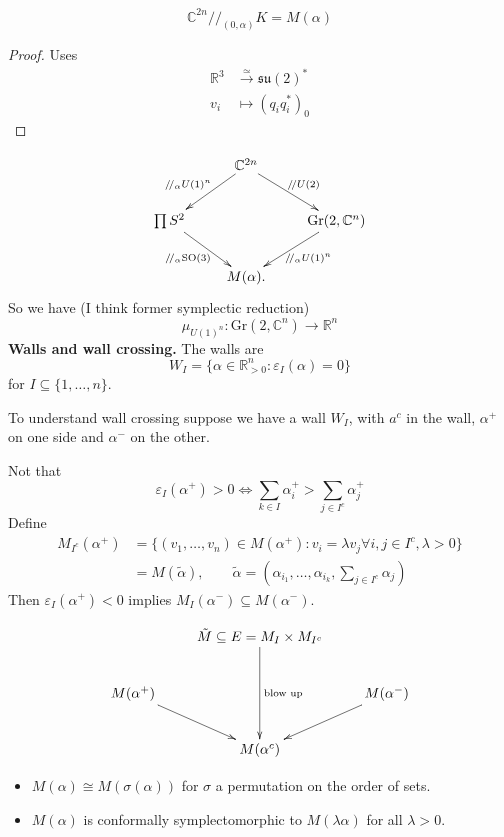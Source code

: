 {\begin{remark}
\begin{theorem}
\label{theorem-Hausmann-Knutson}
$$
\mathbb{C}^{2n}/\!/_{(0,\alpha)}K=M(\alpha)
$$
\end{theorem}

\begin{proof}
Uses 
\begin{align*}
\mathbb{R}^3  &\xrightarrow{\simeq} \mathfrak{su}(2)^* \\
v_i &\longmapsto (q_iq_i^*)_0
\end{align*}
\end{proof}
\end{remark}

$$
\xymatrix{
&\mathbb{C}^{2n}\ar[dl]_{/\!/_\alpha U(1)^n}
\ar[dr]^{/\!/U(2)}\\
\prod S^2 \ar[dr]_{/\!/_\alpha \text{SO}(3)}
 &  &  \text{Gr}(2,\mathbb{C}^n)\ar[dl]^{/\!/_\alpha U(1)^n}\\
&M(\alpha).
}
$$
So we have (I think former symplectic reduction)
$$
\mu_{U(1)^n}:\text{Gr}(2,\mathbb{C}^n)\to \mathbb{R}^n
$$
\medskip\noindent
{\bf Walls and wall crossing.}
The walls are
$$
W_I=\{\alpha \in \mathbb{R}^n_{>0}:\varepsilon_I(\alpha)=0\}
$$
for $I \subseteq \{1,\ldots,n\}$.

To understand wall crossing suppose we have
a wall $W_I$, with $a^c$ in the wall,
$\alpha^+$ on one side and $\alpha^-$ on the other.

Not that
$$
\varepsilon_I(\alpha^+)>0 \iff
\sum_{k \in I}\alpha_i^+> 
\sum_{ j \in I^c}\alpha_j^+
$$
Define
\begin{align*}
M_{I^c}(\alpha^+)
&=\{(v_1,\ldots,v_n) \in M(\alpha^+):
v_i=\lambda v_j \forall i,j \in I^c, \lambda>0\}\\
&=M(\tilde{\alpha}),\qquad \tilde{\alpha}=
\left(\alpha_{i_1},\ldots,\alpha_{i_k},\sum_{j \in I^c}\alpha_j\right)
\end{align*}
Then $\varepsilon_I(\alpha^+)<0$ 
implies $M_I(\alpha^-) \subseteq M(\alpha^-)$.

$$
\xymatrix{
&\tilde{M} \subseteq E=M_I \times M_{I^c}\ar[dd]^{\text{blow up}}\\
M(\alpha^+)\ar[dr]&  &  M(\alpha^-)\ar[dl]\\
&M(\alpha^c)
}
$$
\begin{remark}
\label{remark-moduli-spaces-of-polygons-proportional}
\begin{itemize}
\item $M(\alpha)\cong M(\sigma(\alpha))$
for $\sigma$ a permutation on the order of sets.
\item $M(\alpha)$ is conformally symplectomorphic
to $M(\lambda \alpha)$ for all $\lambda>0$.
\end{itemize}
\end{remark}

}
